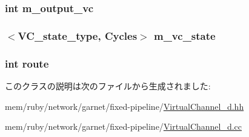 \label{classVirtualChannel__d_aa9a1d8ba034016971170582d929d4799}
\hypertarget{classVirtualChannel__d_a8ed6a5033ed26f0b6181539a86ae153b}{
\subsubsection[{m\_\-output\_\-vc}]{\setlength{\rightskip}{0pt plus 5cm}int {\bf m\_\-output\_\-vc}}}
\label{classVirtualChannel__d_a8ed6a5033ed26f0b6181539a86ae153b}
\hypertarget{classVirtualChannel__d_aca692908703dd8937812aeb855ecece3}{
\subsubsection[{m\_\-vc\_\-state}]{$<${\bf VC\_\-state\_\-type}, {\bf Cycles}$>$ {\bf m\_\-vc\_\-state}}}
\label{classVirtualChannel__d_aca692908703dd8937812aeb855ecece3}
\hypertarget{classVirtualChannel__d_a882872953fb42de6e7f35d22d1b9e3e1}{
\subsubsection[{route}]{\setlength{\rightskip}{0pt plus 5cm}int {\bf route}}}
\label{classVirtualChannel__d_a882872953fb42de6e7f35d22d1b9e3e1}


このクラスの説明は次のファイルから生成されました:\begin{DoxyCompactItemize}
\item 
mem/ruby/network/garnet/fixed-\/pipeline/\hyperlink{VirtualChannel__d_8hh}{VirtualChannel\_\-d.hh}\item 
mem/ruby/network/garnet/fixed-\/pipeline/\hyperlink{VirtualChannel__d_8cc}{VirtualChannel\_\-d.cc}\end{DoxyCompactItemize}
